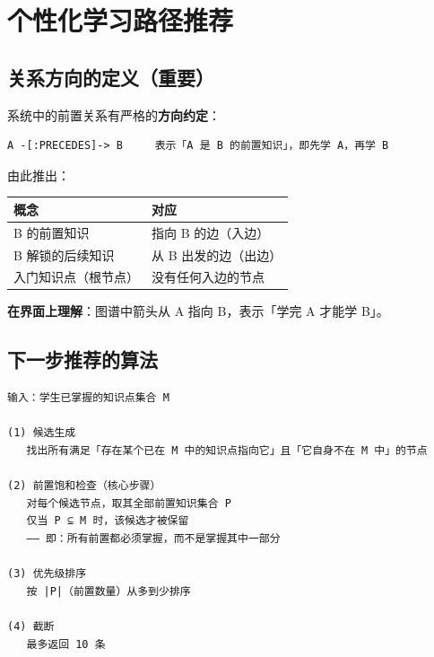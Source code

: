 \documentclass[UTF8,a4paper,11pt]{ctexrep}
\begin{document}
\section{个性化学习路径推荐}


\subsection{关系方向的定义（重要）}

系统中的前置关系有严格的\textbf{方向约定}：

\begin{Verbatim}[breaklines=true,breakanywhere=true,fontsize=\small,frame=single,framesep=4pt,rulecolor=\color{codeframe}]
A -[:PRECEDES]-> B     表示「A 是 B 的前置知识」，即先学 A，再学 B
\end{Verbatim}

由此推出：

\begin{center}
\small
\begin{tabularx}{\linewidth}{@{}XX@{}}
\toprule
概念 & 对应 \\
\midrule
B 的前置知识 & 指向 B 的边（入边） \\
B 解锁的后续知识 & 从 B 出发的边（出边） \\
入门知识点（根节点） & 没有任何入边的节点 \\
\bottomrule
\end{tabularx}
\end{center}
\textbf{在界面上理解}：图谱中箭头从 A 指向 B，表示「学完 A 才能学 B」。


\subsection{下一步推荐的算法}

\begin{Verbatim}[breaklines=true,breakanywhere=true,fontsize=\small,frame=single,framesep=4pt,rulecolor=\color{codeframe}]
输入：学生已掌握的知识点集合 M

(1) 候选生成
   找出所有满足「存在某个已在 M 中的知识点指向它」且「它自身不在 M 中」的节点

(2) 前置饱和检查（核心步骤）
   对每个候选节点，取其全部前置知识集合 P
   仅当 P ⊆ M 时，该候选才被保留
   —— 即：所有前置都必须掌握，而不是掌握其中一部分

(3) 优先级排序
   按 |P|（前置数量）从多到少排序

(4) 截断
   最多返回 10 条
\end{Verbatim}
\end{document}
